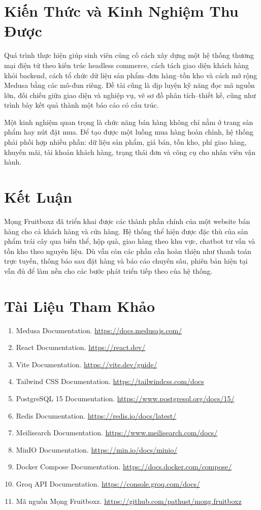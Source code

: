 \section{Kiến Thức và Kinh Nghiệm Thu Được}

Quá trình thực hiện giúp sinh viên củng cố cách xây dựng một hệ thống thương mại điện tử theo kiến trúc headless commerce, cách tách giao diện khách hàng khỏi backend, cách tổ chức dữ liệu sản phẩm--đơn hàng--tồn kho và cách mở rộng Medusa bằng các mô-đun riêng. Đề tài cũng là dịp luyện kỹ năng đọc mã nguồn lớn, đối chiếu giữa giao diện và nghiệp vụ, vẽ sơ đồ phân tích--thiết kế, cũng như trình bày kết quả thành một báo cáo có cấu trúc.

Một kinh nghiệm quan trọng là chức năng bán hàng không chỉ nằm ở trang sản phẩm hay nút đặt mua. Để tạo được một luồng mua hàng hoàn chỉnh, hệ thống phải phối hợp nhiều phần: dữ liệu sản phẩm, giá bán, tồn kho, phí giao hàng, khuyến mãi, tài khoản khách hàng, trạng thái đơn và công cụ cho nhân viên vận hành.

\section{Kết Luận}

Mọng Fruitboxz đã triển khai được các thành phần chính của một website bán hàng cho cả khách hàng và cửa hàng. Hệ thống thể hiện được đặc thù của sản phẩm trái cây qua biến thể, hộp quà, giao hàng theo khu vực, chatbot tư vấn và tồn kho theo nguyên liệu. Dù vẫn còn các phần cần hoàn thiện như thanh toán trực tuyến, thông báo sau đặt hàng và báo cáo chuyên sâu, phiên bản hiện tại vẫn đủ để làm nền cho các bước phát triển tiếp theo của hệ thống.

\section{Tài Liệu Tham Khảo}

\begin{enumerate}[leftmargin=2em, itemsep=4pt]
  \item Medusa Documentation. \url{https://docs.medusajs.com/}
  \item React Documentation. \url{https://react.dev/}
  \item Vite Documentation. \url{https://vite.dev/guide/}
  \item Tailwind CSS Documentation. \url{https://tailwindcss.com/docs}
  \item PostgreSQL 15 Documentation. \url{https://www.postgresql.org/docs/15/}
  \item Redis Documentation. \url{https://redis.io/docs/latest/}
  \item Meilisearch Documentation. \url{https://www.meilisearch.com/docs/}
  \item MinIO Documentation. \url{https://min.io/docs/minio/}
  \item Docker Compose Documentation. \url{https://docs.docker.com/compose/}
  \item Groq API Documentation. \url{https://console.groq.com/docs/}
  \item Mã nguồn Mọng Fruitboxz. \url{https://github.com/pathust/mong.fruitboxz}
\end{enumerate}
